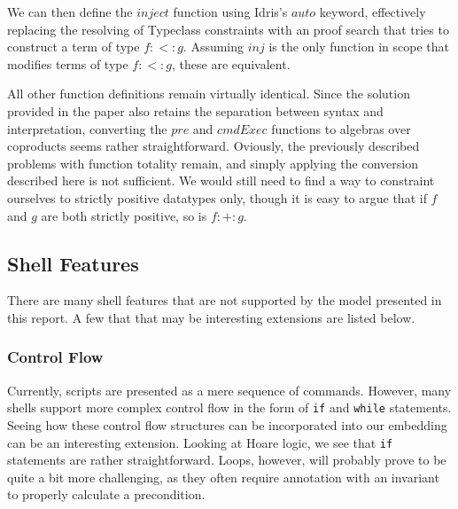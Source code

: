 \documentclass[12pt,a4paper]{article}
\newcommand{\Conid}[1]{\mathit{#1}}
\newcommand{\Varid}[1]{\mathit{#1}}
\def\resethooks{%
  \global\let\SaveRestoreHook\empty
  \global\let\ColumnHook\empty}
\let\hspre\empty
\let\hspost\empty
\begin{document}
We can then define the \ensuremath{\Varid{inject}} function using Idris's \ensuremath{\Varid{auto}} keyword, effectively replacing the resolving of Typeclass constraints with an proof search that tries to construct a term of type \ensuremath{\Varid{f}\mathbin{:<:}\Varid{g}}. Assuming \ensuremath{\Varid{inj}} is the only function in scope that modifies terms of type \ensuremath{\Varid{f}\mathbin{:<:}\Varid{g}}, these are equivalent. 

\resethooks

All other function definitions remain virtually identical. Since the solution provided in the paper also retains the separation between syntax and interpretation, converting the \ensuremath{\Varid{pre}} and \ensuremath{\Varid{cmdExec}} functions to algebras over coproducts seems rather straightforward. Oviously, the previously described problems with function totality remain, and simply applying the conversion described here is not sufficient. We would still need to find a way to constraint ourselves to strictly positive datatypes only, though it is easy to argue that if \ensuremath{\Varid{f}} and \ensuremath{\Varid{g}} are both strictly positive, so is \ensuremath{\Varid{f}\mathbin{:+:}\Varid{g}}. 

\subsection{Shell Features}

There are many shell features that are not supported by the model presented in this report. A few that that may be interesting extensions are listed below. 

\subsubsection{Control Flow}
Currently, scripts are presented as a mere sequence of commands. However, many shells support more complex control flow in the form of \texttt{if} and \texttt{while} statements. Seeing how these control flow structures can be incorporated into our embedding can be an interesting extension. Looking at Hoare logic, we see that \texttt{if} statements are rather straightforward. Loops, however, will probably prove to be quite a bit more challenging, as they often require annotation with an invariant to properly calculate a precondition. 
\end{document}
